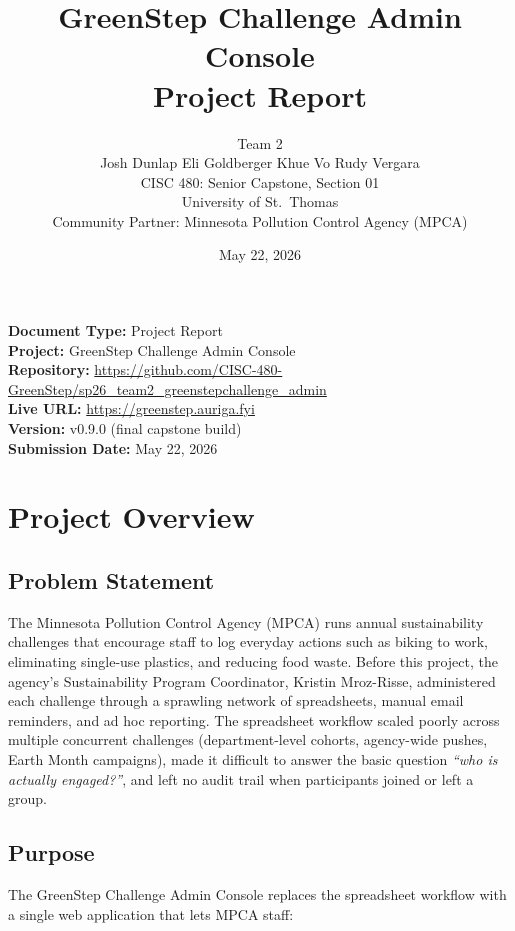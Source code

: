 \documentclass[11pt,letterpaper]{article}
\title{
  \vspace{-1cm}
  \textbf{GreenStep Challenge Admin Console} \\[0.5em]
  \large Project Report
}
\author{
  Team 2 \\
  Josh Dunlap \quad Eli Goldberger \quad Khue Vo \quad Rudy Vergara \\[0.5em]
  CISC 480: Senior Capstone, Section 01 \\
  University of St.\ Thomas \\
  Community Partner: Minnesota Pollution Control Agency (MPCA)
}
\date{May 22, 2026}
\begin{document}
\maketitle
\thispagestyle{empty}

\vfill
\noindent
\textbf{Document Type:} Project Report \\
\textbf{Project:} GreenStep Challenge Admin Console \\
\textbf{Repository:} \url{https://github.com/CISC-480-GreenStep/sp26_team2_greenstepchallenge_admin} \\
\textbf{Live URL:} \url{https://greenstep.auriga.fyi} \\
\textbf{Version:} v0.9.0 (final capstone build) \\
\textbf{Submission Date:} May 22, 2026
\vfill
\newpage

\tableofcontents
\newpage

\section{Project Overview}

\subsection{Problem Statement}

The Minnesota Pollution Control Agency (MPCA) runs annual sustainability
challenges that encourage staff to log everyday actions such as biking to
work, eliminating single-use plastics, and reducing food waste. Before this
project, the agency's Sustainability Program Coordinator,
Kristin Mroz-Risse, administered each challenge through a sprawling network
of spreadsheets, manual email reminders, and ad hoc reporting. The
spreadsheet workflow scaled poorly across multiple concurrent challenges
(department-level cohorts, agency-wide pushes, Earth Month campaigns), made
it difficult to answer the basic question \emph{``who is actually
engaged?''}, and left no audit trail when participants joined or left a
group.

\subsection{Purpose}

The GreenStep Challenge Admin Console replaces the spreadsheet workflow
with a single web application that lets MPCA staff:
\end{document}
